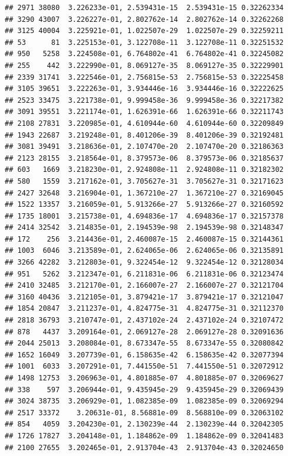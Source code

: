 \documentclass[
]{article}
\begin{document}
\begin{verbatim}
## 2971 38080  3.226233e-01, 2.539431e-15  2.539431e-15 0.32262334
## 3290 43007  3.226227e-01, 2.802762e-14  2.802762e-14 0.32262268
## 3125 40004  3.225921e-01, 1.022507e-29  1.022507e-29 0.32259211
## 53      81  3.225153e-01, 3.122708e-11  3.122708e-11 0.32251532
## 950   5258  3.224508e-01, 6.764802e-41  6.764802e-41 0.32245082
## 255    442  3.222990e-01, 8.069127e-35  8.069127e-35 0.32229901
## 2339 31741  3.222546e-01, 2.756815e-53  2.756815e-53 0.32225458
## 3105 39651  3.222263e-01, 3.934446e-16  3.934446e-16 0.32222625
## 2523 33475  3.221738e-01, 9.999458e-36  9.999458e-36 0.32217382
## 3091 39551  3.221174e-01, 1.626391e-66  1.626391e-66 0.32211743
## 2108 27831  3.220985e-01, 4.610944e-60  4.610944e-60 0.32209849
## 1943 22687  3.219248e-01, 8.401206e-39  8.401206e-39 0.32192481
## 3081 39491  3.218636e-01, 2.107470e-20  2.107470e-20 0.32186363
## 2123 28155  3.218564e-01, 8.379573e-06  8.379573e-06 0.32185637
## 603   1669  3.218230e-01, 2.924808e-11  2.924808e-11 0.32182302
## 580   1559  3.217162e-01, 3.705627e-31  3.705627e-31 0.32171623
## 2427 32648  3.216904e-01, 1.367210e-27  1.367210e-27 0.32169045
## 1522 13357  3.216059e-01, 5.913266e-27  5.913266e-27 0.32160592
## 1735 18001  3.215738e-01, 4.694836e-17  4.694836e-17 0.32157378
## 2414 32542  3.214835e-01, 2.194539e-98  2.194539e-98 0.32148347
## 172    256  3.214436e-01, 2.460087e-15  2.460087e-15 0.32144361
## 1003  6046  3.213589e-01, 2.624065e-06  2.624065e-06 0.32135891
## 3266 42282  3.212803e-01, 9.322454e-12  9.322454e-12 0.32128034
## 951   5262  3.212347e-01, 6.211831e-06  6.211831e-06 0.32123474
## 2410 32485  3.212170e-01, 2.166007e-27  2.166007e-27 0.32121704
## 3160 40436  3.212105e-01, 3.879421e-17  3.879421e-17 0.32121047
## 1854 20847  3.211237e-01, 4.824775e-31  4.824775e-31 0.32112370
## 2818 36793  3.210747e-01, 2.437102e-24  2.437102e-24 0.32107472
## 878   4437  3.209164e-01, 2.069127e-28  2.069127e-28 0.32091636
## 2044 25013  3.208084e-01, 8.673347e-55  8.673347e-55 0.32080842
## 1652 16049  3.207739e-01, 6.158635e-42  6.158635e-42 0.32077394
## 1001  6033  3.207291e-01, 7.441550e-51  7.441550e-51 0.32072912
## 1498 12753  3.206963e-01, 4.801885e-07  4.801885e-07 0.32069627
## 338    597  3.206944e-01, 9.435945e-29  9.435945e-29 0.32069439
## 3024 38735  3.206929e-01, 1.082385e-09  1.082385e-09 0.32069294
## 2517 33372    3.20631e-01, 8.56881e-09  8.568810e-09 0.32063102
## 854   4059  3.204230e-01, 2.130239e-44  2.130239e-44 0.32042305
## 1726 17827  3.204148e-01, 1.184862e-09  1.184862e-09 0.32041483
## 2100 27655  3.202465e-01, 2.913704e-43  2.913704e-43 0.32024650

\end{verbatim}
\end{document}
